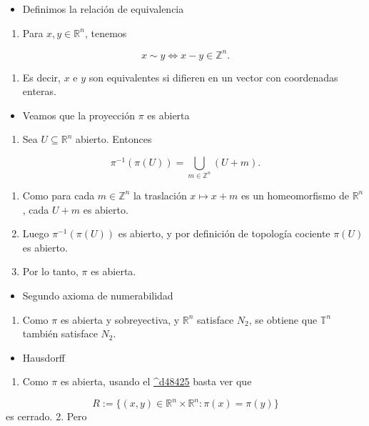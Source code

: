 \begin{bookproof}{}
\begin{itemize}
\item Definimos la relación de equivalencia
\end{itemize}
\begin{enumerate}
\item Para $x,y\in \mathbb{R}^n$, tenemos
\end{enumerate}
\[
x\sim y \iff x-y\in \mathbb{Z}^n.
\]
\begin{enumerate}[start=2]
\item Es decir, $x$ e $y$ son equivalentes si difieren en un vector con coordenadas enteras.
\end{enumerate}
\begin{itemize}
\item Veamos que la proyección $\pi$ es abierta
\end{itemize}
\begin{enumerate}
\item Sea $U\subseteq \mathbb{R}^n$ abierto. Entonces
\end{enumerate}
\[
\pi^{-1}(\pi(U))=\bigcup_{m\in \mathbb{Z}^n}(U+m).
\]
\begin{enumerate}[start=2]
\item Como para cada $m\in \mathbb{Z}^n$ la traslación $x\mapsto x+m$ es un homeomorfismo de $\mathbb{R}^n$, cada $U+m$ es abierto.
\item Luego $\pi^{-1}(\pi(U))$ es abierto, y por definición de topología cociente $\pi(U)$ es abierto.
\item Por lo tanto, $\pi$ es abierta.
\end{enumerate}
\begin{itemize}
\item Segundo axioma de numerabilidad
\end{itemize}
\begin{enumerate}
\item Como $\pi$ es abierta y sobreyectiva, y $\mathbb{R}^n$ satisface $N_2$, se obtiene que $\mathbb{T}^n$ también satisface $N_2$.
\end{enumerate}
\begin{itemize}
\item Hausdorff
\end{itemize}
\begin{enumerate}
\item Como $\pi$ es abierta, usando el \hyperref[blk:d48425]{\textasciicircum{}d48425} basta ver que
\end{enumerate}
\[
R:=\{(x,y)\in \mathbb{R}^n\times \mathbb{R}^n:\pi(x)=\pi(y)\}
\]
es cerrado. 2. Pero


\end{bookproof}
